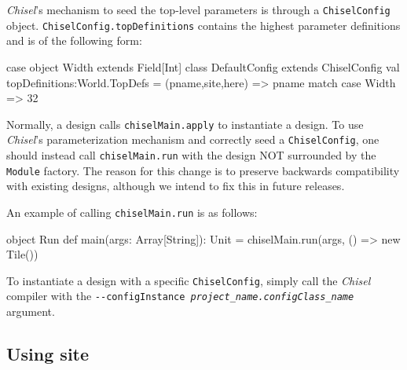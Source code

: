 \documentclass[10pt,twocolumn]{article}
\def\code#1{{\small\tt #1}}
\begin{document}
{\em Chisel}'s mechanism to seed the top-level parameters is through a \code{ChiselConfig} object. \code{ChiselConfig.topDefinitions} contains the highest parameter definitions and is of the following form:
\begin{scala}
case object Width extends Field[Int]
class DefaultConfig extends ChiselConfig { 
  val topDefinitions:World.TopDefs = {
    (pname,site,here) => pname match {
      case Width => 32
    }
  }
}
\end{scala}
Normally, a design calls \code{chiselMain.apply} to instantiate a design. To use {\em Chisel}'s parameterization mechanism and correctly seed a \code{ChiselConfig}, one should instead call \code{chiselMain.run} with the design NOT surrounded by the \code{Module} factory. The reason for this change is to preserve backwards compatibility with existing designs, although we intend to fix this in future releases. 

An example of calling \code{chiselMain.run} is as follows:
\begin{scala}
object Run { 
  def main(args: Array[String]): Unit = {
    chiselMain.run(args, () => new Tile())
  }
}
\end{scala}
To instantiate a design with a specific \code{ChiselConfig}, simply call the {\em Chisel} compiler with the \code{-{-}configInstance {\it project\_name.configClass\_name}} argument.

\subsection{Using site}
\label{sec::site}
\end{document}
